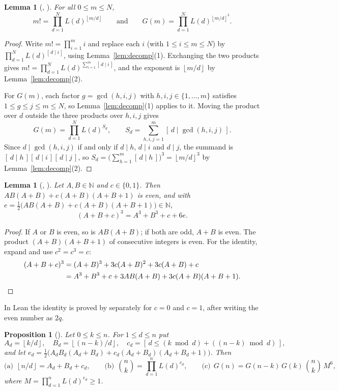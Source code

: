\documentclass[11pt]{amsart}
\theoremstyle{plain}
\newtheorem{lemma}[theorem]{Lemma}
\newtheorem{proposition}[theorem]{Proposition}
\theoremstyle{definition}
\newcommand{\N}{\mathbb{N}}
\newcommand{\fl}[1]{\left\lfloor #1\right\rfloor}
\newcommand{\Ind}[1]{[\,#1\,]}
\begin{document}
\begin{lemma}[, ]\label{lem:products}
For all $0\le m\le N$,
\[
  m!=\prod_{d=1}^{N}L(d)^{\fl{m/d}}\qquad\text{and}\qquad G(m)=\prod_{d=1}^{N}L(d)^{\fl{m/d}^3}.
\]
\end{lemma}

\begin{proof}
Write $m!=\prod_{i=1}^m i$ and replace each $i$ (with $1\le i\le m\le N$) by $\prod_{d=1}^NL(d)^{\Ind{d\mid i}}$, using Lemma~\ref{lem:decomp}(1). Exchanging the two products gives $m!=\prod_{d=1}^NL(d)^{\sum_{i=1}^m\Ind{d\mid i}}$, and the exponent is $\fl{m/d}$ by Lemma~\ref{lem:decomp}(2).

For $G(m)$, each factor $g=\gcd(h,i,j)$ with $h,i,j\in\{1,\dots,m\}$ satisfies $1\le g\le j\le m\le N$, so Lemma~\ref{lem:decomp}(1) applies to it. Moving the product over $d$ outside the three products over $h,i,j$ gives
\[
  G(m)=\prod_{d=1}^NL(d)^{S_d},\qquad S_d=\sum_{h,i,j=1}^{m}\Ind{d\mid\gcd(h,i,j)} .
\]
Since $d\mid\gcd(h,i,j)$ if and only if $d\mid h$, $d\mid i$ and $d\mid j$, the summand is $\Ind{d\mid h}\Ind{d\mid i}\Ind{d\mid j}$, so $S_d=\bigl(\sum_{h=1}^m\Ind{d\mid h}\bigr)^3=\fl{m/d}^3$ by Lemma~\ref{lem:decomp}(2).
\end{proof}

\begin{lemma}[, ]\label{lem:cube}
Let $A,B\in\N$ and $c\in\{0,1\}$. Then $AB(A+B)+c(A+B)(A+B+1)$ is even, and with $e=\tfrac12\bigl(AB(A+B)+c(A+B)(A+B+1)\bigr)\in\N$,
\[
  (A+B+c)^3=A^3+B^3+c+6e .
\]
\end{lemma}

\begin{proof}
If $A$ or $B$ is even, so is $AB(A+B)$; if both are odd, $A+B$ is even. The product $(A+B)(A+B+1)$ of consecutive integers is even. For the identity, expand and use $c^2=c^3=c$:
\begin{align*}
(A+B+c)^3&=(A+B)^3+3c(A+B)^2+3c(A+B)+c\\
&=A^3+B^3+c+3AB(A+B)+3c(A+B)(A+B+1). \qedhere
\end{align*}
\end{proof}

In Lean the identity is proved by  separately for $c=0$ and $c=1$, after writing the even number as $2q$.

\begin{proposition}[]\label{prop:main}
Let $0\le k\le n$. For $1\le d\le n$ put
\[
  A_d=\fl{k/d},\quad B_d=\fl{(n-k)/d},\quad c_d=\Ind{d\le (k\bmod d)+((n-k)\bmod d)},
\]
and let $e_d=\tfrac12\bigl(A_dB_d(A_d+B_d)+c_d(A_d+B_d)(A_d+B_d+1)\bigr)$. Then
\[
  \text{(a)}\ \ \fl{n/d}=A_d+B_d+c_d,\qquad
  \text{(b)}\ \ \binom nk=\prod_{d=1}^nL(d)^{c_d},\qquad
  \text{(c)}\ \ G(n)=G(n-k)\,G(k)\,\binom nk\,M^6,
\]
where $M=\prod_{d=1}^{n}L(d)^{e_d}\ge1$.
\end{proposition}
\end{document}
